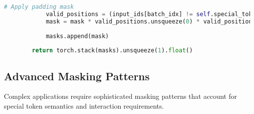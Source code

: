 \begin{lstlisting}[language=Python, caption=Comprehensive attention mask generator for special tokens]
            # Apply padding mask
            valid_positions = (input_ids[batch_idx] != self.special_token_map.get('pad_token', -1))
            mask = mask * valid_positions.unsqueeze(0) * valid_positions.unsqueeze(1)
            
            masks.append(mask)
            
        return torch.stack(masks).unsqueeze(1).float()
\end{lstlisting}

\subsection{Advanced Masking Patterns}

Complex applications require sophisticated masking patterns that account for special token semantics and interaction requirements.

